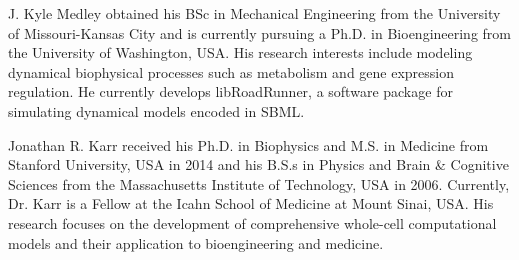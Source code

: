 \documentclass[journal,transmag,twoside]{IEEEtran}
\begin{document}
\begin{IEEEbiography}{J. Kyle Medley}
obtained his BSc in Mechanical Engineering from the University of Missouri-Kansas City and
is currently pursuing a Ph.D. in Bioengineering from the University of Washington, USA.
His research interests include modeling dynamical biophysical processes such as
metabolism and gene expression regulation.
He currently develops libRoadRunner, a software package for simulating dynamical models encoded in SBML.
\end{IEEEbiography}

\begin{IEEEbiography}{Jonathan R. Karr}
received his Ph.D. in Biophysics and M.S. in Medicine from Stanford University, USA in 2014 and his B.S.s in Physics and Brain \& Cognitive Sciences from the Massachusetts Institute of Technology, USA in 2006. Currently, Dr. Karr is a Fellow at the Icahn School of Medicine at Mount Sinai, USA. His research focuses on the development of comprehensive whole-cell computational models and their application to bioengineering and medicine.
\end{IEEEbiography}

\vfill
\end{document}
